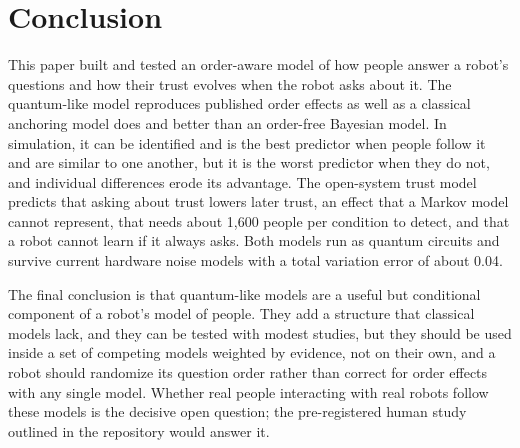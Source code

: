 \section{Conclusion}\label{sec:conclusion}
This paper built and tested an order-aware model of how people answer a robot's questions and how their trust evolves when the robot asks about it. The quantum-like model reproduces published order effects as well as a classical anchoring model does and better than an order-free Bayesian model. In simulation, it can be identified and is the best predictor when people follow it and are similar to one another, but it is the worst predictor when they do not, and individual differences erode its advantage. The open-system trust model predicts that asking about trust lowers later trust, an effect that a Markov model cannot represent, that needs about 1,600 people per condition to detect, and that a robot cannot learn if it always asks. Both models run as quantum circuits and survive current hardware noise models with a total variation error of about 0.04.

The final conclusion is that quantum-like models are a useful but conditional component of a robot's model of people. They add a structure that classical models lack, and they can be tested with modest studies, but they should be used inside a set of competing models weighted by evidence, not on their own, and a robot should randomize its question order rather than correct for order effects with any single model. Whether real people interacting with real robots follow these models is the decisive open question; the pre-registered human study outlined in the repository would answer it.
